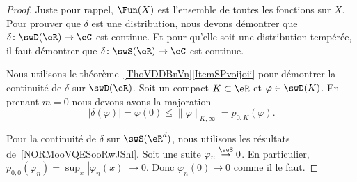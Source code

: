 \begin{proof}
    Juste pour rappel, \( \Fun(X)\) est l'ensemble de toutes les fonctions sur \( X\). Pour prouver que \( \delta\) est une distribution, nous devons démontrer que \( \delta\colon \swD(\eR)\to \eC\) est continue. Et pour qu'elle soit une distribution tempérée, il faut démontrer que \( \delta\colon \swS(\eR)\to \eC\) est continue.

    Nous utilisons le théorème~\ref{ThoVDDBnVn}\ref{ItemSPvoijoii} pour démontrer la continuité de \( \delta\) sur \( \swD(\eR)\). Soit un compact \( K\subset \eR\) et \( \varphi\in \swD(K)\). En prenant \( m=0\) nous devons avons la majoration
    \begin{equation}
        | \delta(\varphi)|=\varphi(0) \leq \| \varphi \|_{K,\infty}=p_{0,K}(\varphi).
    \end{equation}

    Pour la continuité de \( \delta\) sur \( \swS(\eR^d)\), nous utilisons les résultats de~\ref{NORMooVQESooRwJShl}. Soit une suite \( \varphi_n\stackrel{\swS}{\to}0\). En particulier, \( p_{0,0}(\varphi_n)=\sup_x| \varphi_n(x) |\to 0\). Donc \( \varphi_n(0)\to 0\) comme il le faut.
\end{proof}

